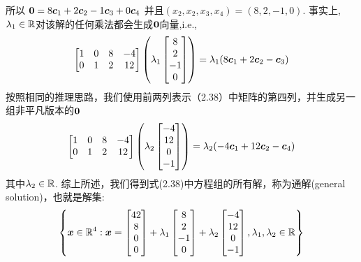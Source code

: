 所以
$\boldsymbol{0}= 8\boldsymbol{c}_1 + 2\boldsymbol{c}_2 - 1\boldsymbol{c}_3 + 0\boldsymbol{c}_4$
并且$(x_2, x_2, x_3, x_4) = (8, 2, -1, 0)$.
事实上, $\lambda_1 \in \mathbb{R}$对该解的任何乘法都会生成$\boldsymbol{0}$向量,i.e.,
\begin{equation}
\begin{bmatrix}
    1 & 0 & 8 & -4 \\
    0 & 1 & 2 & 12
\end{bmatrix}
\left(
\lambda_1
\begin{bmatrix}
    8 \\ 2 \\ -1 \\ 0
\end{bmatrix}
\right)=
\lambda_1(8\boldsymbol{c}_1 + 2\boldsymbol{c}_2 - \boldsymbol{c}_3)
\end{equation}
按照相同的推理思路，我们使用前两列表示（2.38）中矩阵的第四列，并生成另一组非平凡版本的$\boldsymbol{0}$
\begin{equation}
    \begin{bmatrix}
        1 & 0 & 8 & -4 \\
        0 & 1 & 2 & 12
    \end{bmatrix}
    \left(
    \lambda_2
    \begin{bmatrix}
        -4 \\ 12 \\ 0 \\ -1
    \end{bmatrix}
    \right)
    =
    \lambda_2(-4\boldsymbol{c}_1 + 12\boldsymbol{c}_2 - \boldsymbol{c}_4)
\end{equation}
其中$\lambda_2 \in \mathbb{R}$.
综上所述，我们得到式(2.38)中方程组的所有解，称为通解(general solution)，也就是解集:
\begin{equation}
    \left\{
    \boldsymbol{x} \in \mathbb{R}^4:
    \boldsymbol{x}=
    \begin{bmatrix} 42 \\ 8 \\ 0 \\ 0 \end{bmatrix}
    +\lambda_1
    \begin{bmatrix} 8 \\ 2 \\ -1 \\ 0 \end{bmatrix}
    +\lambda_2
    \begin{bmatrix} -4 \\ 12 \\ 0 \\ -1 \end{bmatrix}
    ,\lambda_1, \lambda_2 \in \mathbb{R}
    \right\}
\end{equation}

